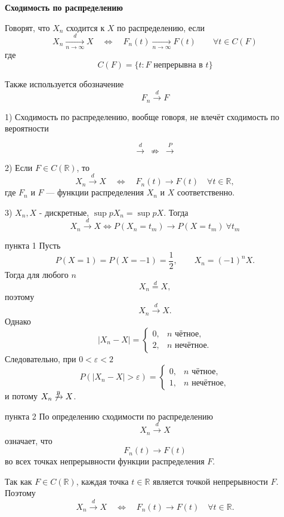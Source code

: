 \documentclass[12pt,a4paper]{article}
\begin{document}
\begin{definition}

\textbf{Сходимость по распределению}

Говорят, что $X_n$ сходится к $X$ по распределению, если
\[
X_n\xrightarrow[n\to\infty]{d}X
\quad\Longleftrightarrow\quad
F_n(t)\xrightarrow[n\to\infty]{}F(t)
\qquad
\forall t\in C(F)
\]
где
\[
C(F)=\{t:F\text{ непрерывна в }t\}
\]

Также используется обозначение
\[
F_n\xrightarrow{d}F
\]

\end{definition}

\begin{note}
1) Сходимость по распределению, вообще говоря, не влечёт сходимость по вероятности

\[
\xrightarrow{d} \ \not\Rightarrow \ \xrightarrow{P}
\]

\bigskip

2) Если $F\in C(\mathbb{R})$, то
   \[
   X_n\xrightarrow{d}X
   \quad\Longleftrightarrow\quad
   F_n(t)\longrightarrow F(t)
   \quad \forall t\in\mathbb{R},
   \]
   где $F_n$ и $F$ --- функции распределения $X_n$ и $X$ соответственно.

\bigskip

3)  $X_n, X$ - дискретные, $\sup pX_n = \sup pX$. Тогда
\[
X_n \xrightarrow{d}X \Longleftrightarrow P(X_n=t_m) \to P(X = t_m) \ \forall t_m 
\]

\end{note}

\begin{proofbox}{пункта 1}
Пусть
\[
P\left(X=1\right)=P\left(X=-1\right)=\frac12,
\qquad
X_n=(-1)^nX.
\]
Тогда для любого $n$
\[
X_n\overset{d}{=}X,
\]
поэтому
\[
X_n\xrightarrow{d}X.
\]
Однако
\[
|X_n-X|=
\begin{cases}
0, & n \text{ чётное},\\
2, & n \text{ нечётное}.
\end{cases}
\]
Следовательно, при $0<\varepsilon<2$
\[
P\left(|X_n-X|>\varepsilon\right)=
\begin{cases}
0, & n \text{ чётное},\\
1, & n \text{ нечётное},
\end{cases}
\]
и потому $X_n\not\xrightarrow{p}X$.
\end{proofbox}

\begin{proofbox}{пункта 2}
По определению сходимости по распределению
\[
X_n\xrightarrow{d}X
\]
означает, что
\[
F_n(t)\longrightarrow F(t)
\]
во всех точках непрерывности функции распределения $F$.

Так как $F\in C(\mathbb{R})$, каждая точка $t\in\mathbb{R}$ является точкой непрерывности $F$. Поэтому
\[
X_n\xrightarrow{d}X
\quad\Longleftrightarrow\quad
F_n(t)\longrightarrow F(t)
\quad\forall t\in\mathbb{R}.
\]
\end{proofbox}
\end{document}
